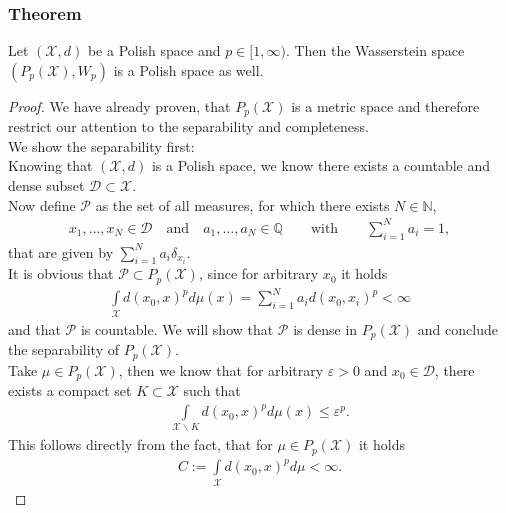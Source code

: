\documentclass[11pt,a4paper]{article}
\begin{document}
\subsubsection{Theorem}
Let $(\mathcal{X},d)$ be a Polish space and $p\in{}[1,\infty)$. Then the Wasserstein space $(P_p(\mathcal{X}),W_p)$ is a Polish space as well.
\begin{proof}
We have already proven, that $P_p(\mathcal{X})$ is a metric space and therefore restrict our attention to the separability and completeness.\vspace{1em}\\
We show the separability first:\\
Knowing that $(\mathcal{X},d)$ is a Polish space, we know there exists a countable and dense subset $\mathcal{D}\subset\mathcal{X}$. \vspace{1em}\\
Now define $\mathcal{P}$ as the set of all measures, for which there exists $N\in\mathbb{N}$,
\begin{align*}
x_1,\ldots{},x_N\in\mathcal{D}\quad{}\text{and}\quad{}a_1,\ldots,a_N\in\mathbb{Q} \quad\quad\text{with}\quad\quad \sum\limits_{i=1}^{N}a_i=1, 
\end{align*}
that are given by \hspace{0.3em}$\sum\limits_{i=1}^{N}a_i\delta_{x_i}.$\vspace{1.5em}\\
It is obvious that $\mathcal{P}\subset{}P_p(\mathcal{X})$, since for arbitrary $x_0$ it holds
\begin{align*}
\int\limits_{\mathcal{X}}d(x_0,x)^pd\mu(x) = \sum\limits_{i=1}^{N}a_id(x_0,x_i)^p<\infty
\end{align*}
and that $\mathcal{P}$ is countable.
We will show that $\mathcal{P}$ is dense in $P_p(\mathcal{X})$ and conclude the separability of $P_p(\mathcal{X}).$\vspace{1em}\\
Take $\mu\in{}P_p(\mathcal{X})$, then we know that for arbitrary $\varepsilon>0$ and $x_0\in\mathcal{D}$, there exists a compact set $K\subset\mathcal{X}$ such that 
\begin{align}
\int\limits_{\mathcal{X}\backslash{}K}d(x_0,x)^pd\mu(x)\leq\varepsilon^p. 
\label{Compact}
\end{align}
This follows directly from the fact, that for $\mu\in{}P_p(\mathcal{X})$ it holds 
\begin{align*}
C:=\int\limits_{\mathcal{X}}d(x_0,x)^pd\mu <\infty.
\end{align*}

\end{proof}
\end{document}
